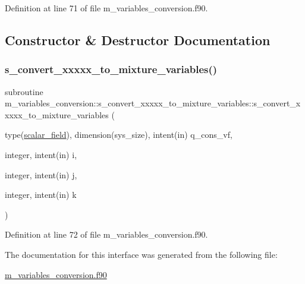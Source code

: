 Definition at line 71 of file m\+\_\+variables\+\_\+conversion.\+f90.



\subsection{Constructor \& Destructor Documentation}
\mbox{\label{interfacem__variables__conversion_1_1s__convert__xxxxx__to__mixture__variables_a613b1d782dd62624e87db77b822d82ff}} 
\subsubsection{\texorpdfstring{s\+\_\+convert\+\_\+xxxxx\+\_\+to\+\_\+mixture\+\_\+variables()}{s\_convert\_xxxxx\_to\_mixture\_variables()}}
{\footnotesize\ttfamily subroutine m\+\_\+variables\+\_\+conversion\+::s\+\_\+convert\+\_\+xxxxx\+\_\+to\+\_\+mixture\+\_\+variables\+::s\+\_\+convert\+\_\+xxxxx\+\_\+to\+\_\+mixture\+\_\+variables (\begin{DoxyParamCaption}\item[{type(\hyperlink{structm__derived__types_1_1scalar__field}{scalar\+\_\+field}), dimension(sys\+\_\+size), intent(in)}]{q\+\_\+cons\+\_\+vf,  }\item[{integer, intent(in)}]{i,  }\item[{integer, intent(in)}]{j,  }\item[{integer, intent(in)}]{k }\end{DoxyParamCaption})}



Definition at line 72 of file m\+\_\+variables\+\_\+conversion.\+f90.



The documentation for this interface was generated from the following file\+:\begin{DoxyCompactItemize}
\item 
\hyperlink{m__variables__conversion_8f90}{m\+\_\+variables\+\_\+conversion.\+f90}\end{DoxyCompactItemize}
